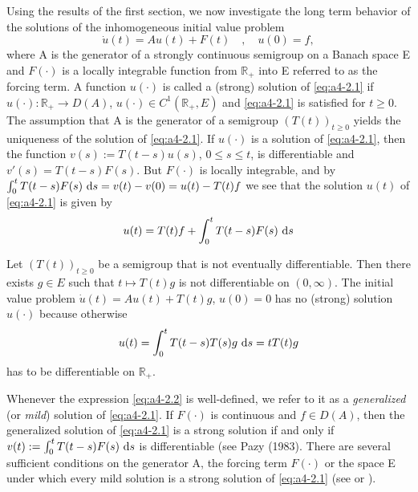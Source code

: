 Using the results of the first section, we now investigate the long
term behavior of the solutions of the inhomogeneous initial value
problem
\begin{equation}\label{eq:a4-2.1}
\dot{u}(t) = Au(t) + F(t) \quad , \quad u(0) = f,
\end{equation}
where A is the generator of a strongly continuous semigroup on a
Banach space E and $F(\cdot)$ is a locally integrable function from $\mathbb{R}_{+}$
into E referred to as the forcing term. 
A function $u(\cdot)$ is called a (strong)
solution of \eqref{eq:a4-2.1} if $u(\cdot) \colon \mathbb{R}_{+} \to D(A)$, $u(\cdot) \in C^{1}(\mathbb{R}_{+},E)$ and \eqref{eq:a4-2.1} is satisfied for $t \geq 0$.
The assumption that A is the generator of a semigroup $(T(t))_{t \geq 0}$
yields the uniqueness of the solution of \eqref{eq:a4-2.1}. 
If $u(\cdot)$ is a solution of \eqref{eq:a4-2.1}, then the function $v(s) := T(t-s)u(s)$, $0 \leq s \leq t$, is
differentiable and $v'(s) = T(t-s)F(s)$. 
But $F(\cdot)$ is locally integrable, and by $\int_{0}^{t} T(t-s)F(s) \,\mathop{}\!\mathrm{d}{s} = v(t) - v(0) = u(t) - T(t)f$ we see
that the solution $u(t)$ of \eqref{eq:a4-2.1} is given by
\begin{equation}\label{eq:a4-2.2}
u(t) = T(t)f + \int_{0}^{t} T(t-s)F(s) \,\mathop{}\!\mathrm{d}{s}
\end{equation}

\bigskip
{} \label{ex:a4-2.1}
Let $(T(t))_{t \geq 0}$ be a semigroup that is not eventually differentiable. 
Then there
exists $g \in E$ such that $t \mapsto T(t)g$ is not differentiable on $(0,\infty)$.
The initial value problem $\dot{u}(t) = Au(t) + T(t)g$, $u(0) = 0$ has no
(strong) solution $u(\cdot)$ because otherwise
\begin{align*}
u(t) = \int_{0}^{t} T(t-s)T(s)g \,\mathop{}\!\mathrm{d}{s} = tT(t)g
\end{align*}
has to be differentiable on $\mathbb{R}_{+}$.

\bigskip
\noindent
Whenever the expression \eqref{eq:a4-2.2} is well-defined, we refer to it as a  \emph{generalized} (or
\emph{mild}) solution of \eqref{eq:a4-2.1}. 
If $F(\cdot)$ is continuous and $f \in D(A)$, then
the generalized solution of \eqref{eq:a4-2.1} is a strong solution if and only if
$v(t) := \int_{0}^{t} T(t-s)F(s) \,\mathop{}\!\mathrm{d}{s}$ is differentiable (see \citet[Chap.4,2.4]{pazy:1983}Pazy (1983). 
There are several sufficient conditions on the generator A,
the forcing term $F(\cdot)$ or the space E under which every mild solution
is a strong solution of \eqref{eq:a4-2.1} (see \citet{travis:1979}
or  \citet[Sec.4.2]{pazy:1983}).

